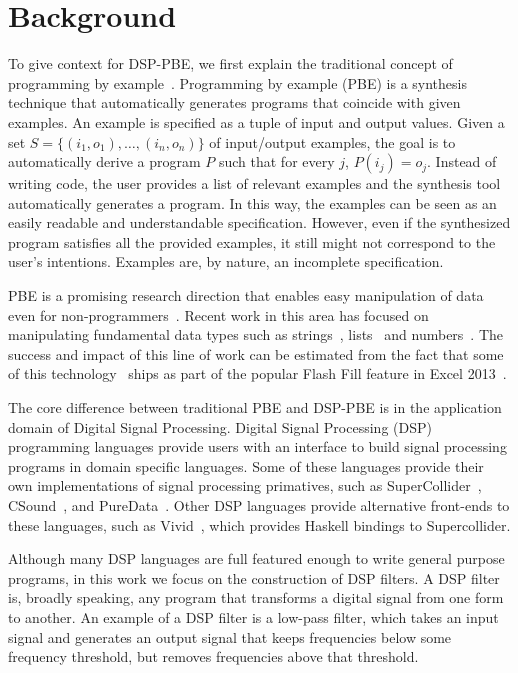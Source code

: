 \section{Background}

To give context for DSP-PBE, we first explain the traditional concept of programming by example~\cite{cypher93,lieberman01,synasc12}.
Programming by example (PBE) is a synthesis technique that automatically generates programs that coincide with given examples. An example is specified as a tuple of input and output values. Given a set $S= \{(i_1, o_1),\ldots, (i_n, o_n)\}$ of input/output examples, the goal is to automatically derive a program $P$ such that for every $j$, $P(i_j) = o_j$. 
Instead of writing code, the user provides a list of relevant examples and the synthesis tool automatically generates a program. In this way, the examples can be seen as an easily readable and understandable specification. However, even if the synthesized program satisfies all the provided examples, it still might not correspond to the user's intentions. Examples are, by nature, an incomplete specification.

PBE is a promising research direction that enables easy manipulation of data even for non-programmers~\cite{GulwaniHS12}. Recent work in this area has focused on manipulating fundamental data types such as strings~\cite{vldb12,icml13}, lists~\cite{FeserCD15,poseraZ15} and numbers~\cite{cav12}. The success and impact of this line of work can be estimated from the fact that some of this technology~\cite{flashFillPOPL} ships as part of the popular Flash Fill feature in Excel 2013~\cite{flashfill}.


The core difference between traditional PBE and DSP-PBE is in the application domain of Digital Signal Processing.
Digital Signal Processing (DSP) programming languages provide users with an interface to build signal processing programs in domain specific languages.
Some of these languages provide their own implementations of signal processing primatives, such as SuperCollider~\cite{supercollider}, CSound~\cite{csound}, and PureData~\cite{puredata}.
Other DSP languages provide alternative front-ends to these languages, such as Vivid~\cite{vivid}, which provides Haskell bindings to Supercollider.

Although many DSP languages are full featured enough to write general purpose programs, in this work we focus on the construction of DSP filters.
A DSP filter is, broadly speaking, any program that transforms a digital signal from one form to another.
An example of a DSP filter is a low-pass filter, which takes an input signal and generates an output signal that keeps frequencies below some frequency threshold, but removes frequencies above that threshold.

